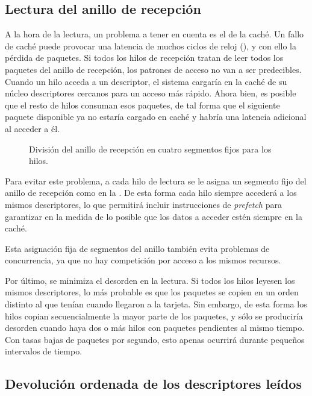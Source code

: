 \documentclass[oneside, draft]{epstfg}
\begin{document}
\subsection{Lectura del anillo de recepción}

A la hora de la lectura, un problema a tener en cuenta es el de la caché. Un fallo de caché puede provocar una latencia de muchos ciclos de reloj (), y con ello la pérdida de paquetes. Si todos los hilos de recepción tratan de leer todos los paquetes del anillo de recepción, los patrones de acceso no van a ser predecibles. Cuando un hilo acceda a un descriptor, el sistema cargaría en la caché de su núcleo descriptores cercanos para un acceso más rápido. Ahora bien, es posible que el resto de hilos consuman esos paquetes, de tal forma que el siguiente paquete disponible ya no estaría cargado en caché y habría una latencia adicional al acceder a él.

\begin{wrapfigure}[8]{R}{0.3\textwidth}
\centering
\vspace{-20pt}

\caption{División del anillo de recepción en cuatro segmentos fijos para los hilos.}
\label{fig:RingAssignment}
\end{wrapfigure}

Para evitar este problema, a cada hilo de lectura se le asigna un segmento fijo del anillo de recepción como en la . De esta forma cada hilo siempre accederá a los mismos descriptores, lo que permitirá incluir instrucciones de \textit{prefetch} para garantizar en la medida de lo posible que los datos a acceder estén siempre en la caché.

Esta asignación fija de segmentos del anillo también evita problemas de concurrencia, ya que no hay competición por acceso a los mismos recursos.

Por último, se minimiza el desorden en la lectura. Si todos los hilos leyesen los mismos descriptores, lo más probable es que los paquetes se copien en un orden distinto al que tenían cuando llegaron a la tarjeta. Sin embargo, de esta forma los hilos copian secuencialmente la mayor parte de los paquetes, y sólo se produciría desorden cuando haya dos o más hilos con paquetes pendientes al mismo tiempo. Con tasas bajas de paquetes por segundo, esto apenas ocurrirá durante pequeños intervalos de tiempo.

\subsection{Devolución ordenada de los descriptores leídos}
\end{document}
